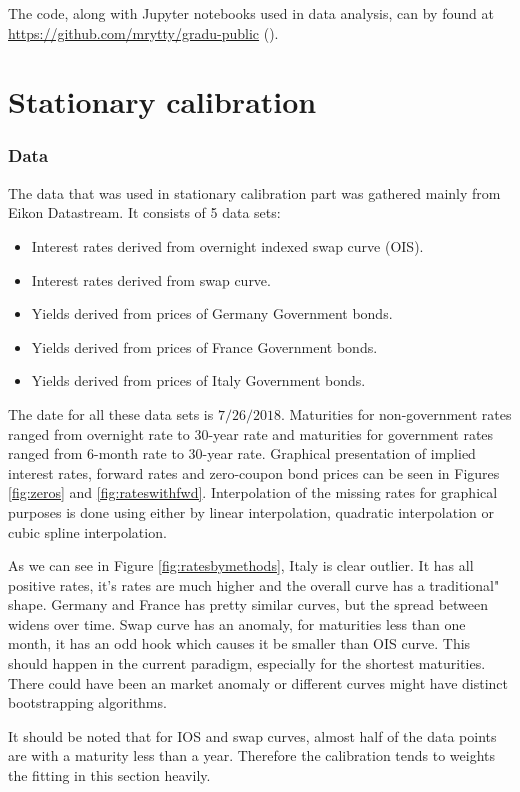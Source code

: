 The code, along with Jupyter notebooks used in data analysis, can by found at \url{https://github.com/mrytty/gradu-public} (\cite{rytty}).

\section{Stationary calibration}

\subsubsection{Data}

The data that was used in stationary calibration part was gathered mainly from Eikon Datastream. It consists of 5 data sets:
\begin{itemize}
	\item Interest rates derived from overnight indexed swap curve (OIS).
	\item Interest rates derived from swap curve.
	\item Yields derived from prices of Germany Government bonds.
	\item Yields derived from prices of France Government bonds.
	\item Yields derived from prices of Italy Government bonds.
\end{itemize}
The date for all these data sets is $7/26/2018$. Maturities for non-government rates ranged from overnight rate to 30-year rate and maturities for government rates ranged from 6-month rate to 30-year rate. Graphical presentation of implied interest rates, forward rates and zero-coupon bond prices can be seen in Figures \ref{fig:zeros} and \ref{fig:rateswithfwd}. Interpolation of the missing rates for graphical purposes is done using either by linear interpolation, quadratic interpolation or cubic spline interpolation. 

As we can see in Figure \ref{fig:ratesbymethods}, Italy is clear outlier. It has all positive rates, it's rates are much higher and the overall curve has a traditional" shape. Germany and France has pretty similar curves, but the spread between widens over time. Swap curve has an anomaly, for maturities less than one month, it has an odd hook which causes it be smaller than OIS curve. This should happen in the current paradigm, especially for the shortest maturities. There could have been an market anomaly or different curves might have distinct bootstrapping algorithms.

It should be noted that for IOS and swap curves, almost half of the data points are with a maturity less than a year. Therefore the calibration tends to weights the fitting in this section heavily.

